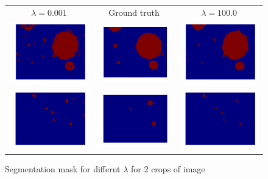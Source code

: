 \begin{figure}[h!] \label{fig:rf_vip1}
\begin{tabular}{ccc}
 $\lambda=0.001$ & Ground truth & $\lambda=100.0$ \\ 
 \includegraphics[width=0.33\linewidth]{figures/u_00.pdf} & \includegraphics[width=0.33\linewidth]{figures/u_01.pdf} & \includegraphics[width=0.33\linewidth]{figures/u_02.pdf} \\
 \includegraphics[width=0.33\linewidth]{figures/u_10.pdf} & \includegraphics[width=0.33\linewidth]{figures/u_11.pdf} & \includegraphics[width=0.33\linewidth]{figures/u_12.pdf} 
\end{tabular}
\caption{Segmentation mask for differnt $\lambda$ for 2 crops of image}
\end{figure}


